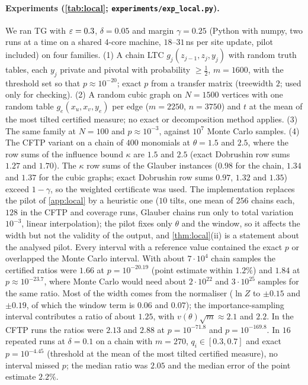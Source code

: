 \paragraph{Experiments (\cref{tab:local}; \texttt{experiments/exp\_local.py}).} We ran TG
with $\varepsilon=0.3$, $\delta=0.05$ and margin $\gamma=0.25$ (Python with numpy, two runs at a time
on a shared 4-core machine, $18$--$31$\,ns per site update, pilot included) on four families. (1) A chain LTC $g_j(z_{j-1},z_j,y_j)$ with random truth
tables, each $y_j$ private and pivotal with probability $\ge\frac12$, $m=1600$, with the
threshold set so that $p\approx10^{-20}$; exact $p$ from a transfer matrix (treewidth $2$;
used only for checking). (2) A random cubic graph on $N=1500$ vertices with one random table
$g_e(x_u,x_v,y_e)$ per edge ($m=2250$, $n=3750$) and $t$ at the mean of the most tilted
certified measure; no exact or decomposition method applies. (3) The same family at
$N=100$ and $p\approx10^{-3}$, against $10^7$ Monte Carlo samples. (4) The CFTP variant on a
chain of $400$ monomials at $\theta=1.5$ and $2.5$, where the row sums of the influence bound
$\kappa$ are $1.5$ and $2.5$ (exact Dobrushin row sums $1.27$ and $1.70$). The $\kappa$ row
sums of the Glauber instances ($0.98$ for the chain, $1.34$ and $1.37$ for the cubic graphs;
exact Dobrushin row sums $0.97$, $1.32$ and $1.35$) exceed $1-\gamma$, so the weighted
certificate was used. The implementation replaces the pilot of \cref{app:local} by a
heuristic one ($10$ tilts, one mean of $256$ chains each, $128$ in the CFTP and coverage
runs, Glauber chains run only to total variation $10^{-3}$, linear interpolation); the
pilot fixes only $\theta$ and the window, so
it affects the width but not the validity of the output, and \cref{thm:local}(ii) is a
statement about the analysed pilot. Every interval with a reference value contained the
exact $p$ or overlapped the Monte Carlo interval. With about $7\cdot10^4$ chain samples
the certified ratios were $1.66$ at $p=10^{-20.19}$ (point estimate within $1.2\%$) and $1.84$
at $p\approx10^{-23.7}$, where Monte Carlo would need about $2\cdot10^{22}$ and $3\cdot10^{25}$
samples for the same ratio. Most of the width comes from the normaliser
($\ln Z$ to $\pm0.15$ and $\pm0.19$, of which the window term is $0.06$ and $0.07$); the
importance-sampling interval contributes a ratio of about $1.25$, with
$v(\theta)\sqrt m\approx2.1$ and $2.2$. In the CFTP runs the ratios were $2.13$ and $2.88$ at
$p=10^{-71.8}$ and $p=10^{-169.8}$. In $16$ repeated runs at $\delta=0.1$ on a chain with
$m=270$, $q_i\in[0.3,0.7]$ and exact $p=10^{-4.45}$ (threshold at the mean of the most tilted certified measure), no interval
missed $p$; the median ratio was $2.05$ and the median error of the point estimate $2.2\%$.

